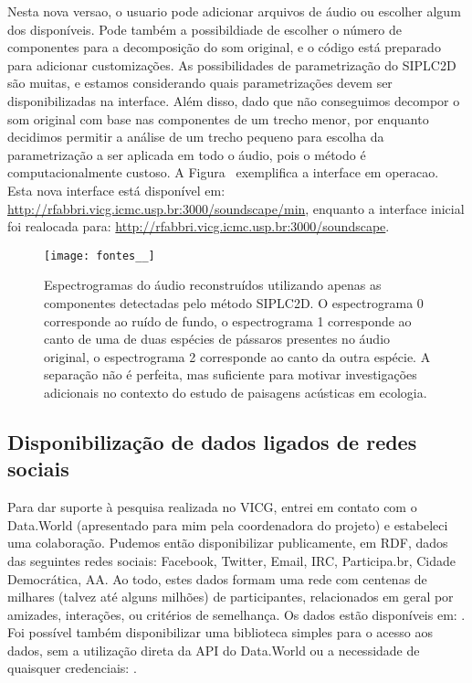 \documentclass[a4paper, 11pt]{article}
\begin{document}
Nesta nova versao, o usuario pode adicionar arquivos de áudio ou escolher algum dos disponíveis.
Pode também a possibildiade de escolher o número de componentes para a decomposição do som original,
e o código está preparado para adicionar customizações.
As possibilidades de parametrização do SIPLC2D são muitas, e estamos considerando quais
parametrizações devem ser disponibilizadas na interface.
Além disso, dado que não conseguimos decompor o som original com base nas componentes de um
trecho menor, por enquanto decidimos permitir a análise de um trecho pequeno para escolha da
parametrização a ser aplicada em todo o áudio, pois o método é computacionalmente custoso.
A Figura~\cite{ps} exemplifica a interface em operacao.
Esta nova interface está disponível em: \url{http://rfabbri.vicg.icmc.usp.br:3000/soundscape/min},
enquanto a interface inicial foi realocada para: \url{http://rfabbri.vicg.icmc.usp.br:3000/soundscape}.


\begin{figure}[h!]
\centering
  \texttt{[image: fontes\_\_]}
\caption{%
  Espectrogramas do áudio reconstruídos utilizando apenas
  as componentes detectadas pelo método SIPLC2D.
  O espectrograma 0 corresponde ao ruído de fundo,
  o espectrograma 1 corresponde ao canto de uma de duas espécies de pássaros
  presentes no áudio original,
  o espectrograma 2 corresponde ao canto da outra espécie.
  A separação não é perfeita, mas suficiente para motivar investigações adicionais no contexto do estudo de paisagens acústicas em ecologia.
}\label{ps}
\end{figure}

\subsection{Disponibilização de dados ligados de redes sociais}
Para dar suporte à pesquisa realizada no VICG, entrei em contato com o
Data.World (apresentado para mim pela coordenadora do projeto)
e estabeleci uma colaboração.
Pudemos então disponibilizar publicamente, em RDF, dados das seguintes redes sociais:
Facebook, Twitter, Email, IRC, Participa.br, Cidade Democrática, AA.
Ao todo, estes dados formam uma rede com centenas de milhares (talvez até alguns milhões)
de participantes, relacionados em geral por amizades, interações, ou critérios de semelhança.
Os dados estão disponíveis em:
\cite{}.
Foi possível também disponibilizar uma biblioteca simples para o acesso aos dados,
sem a utilização direta da API do Data.World ou a necessidade de quaisquer credenciais:
\cite{}.
\end{document}
